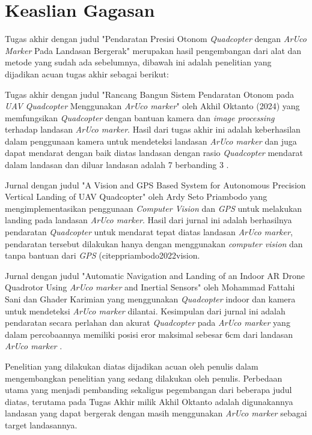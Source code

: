 \section{Keaslian Gagasan}
Tugas akhir dengan judul "Pendaratan Presisi Otonom \textit{Quadcopter} dengan \textit{ArUco Marker} Pada Landasan Bergerak" merupakan hasil pengembangan dari alat dan metode yang sudah ada sebelumnya, dibawah ini adalah penelitian yang dijadikan acuan tugas akhir sebagai berikut:

\begin{packed_enum}
	\item Tugas akhir dengan judul "Rancang Bangun Sistem Pendaratan Otonom pada \textit{UAV} \textit{Quadcopter} Menggunakan \textit{ArUco marker}" oleh Akhil Oktanto (2024) yang memfungsikan \textit{Quadcopter} dengan bantuan kamera dan \textit{image processing} terhadap landasan \textit{ArUco marker}. Hasil dari tugas akhir ini adalah keberhasilan dalam penggunaan kamera untuk mendeteksi landasan \textit{ArUco marker} dan juga dapat mendarat dengan baik diatas landasan dengan rasio \textit{Quadcopter} mendarat dalam landasan dan diluar landasan adalah 7 berbanding 3 \citep{akhiloktantoqc}.
	\item Jurnal dengan judul "A Vision and GPS Based System for Autonomous Precision Vertical Landing of UAV Quadcopter" oleh Ardy Seto Priambodo yang mengimplementasikan penggunaan \textit{Computer Vision} dan \textit{GPS} untuk melakukan landing pada landasan \textit{ArUco marker}. Hasil dari jurnal ini adalah berhasilnya pendaratan \textit{Quadcopter} untuk mendarat tepat diatas landasan \textit{ArUco marker}, pendaratan tersebut dilakukan hanya dengan menggunakan \textit{computer vision} dan tanpa bantuan dari \textit{GPS} (citep{priambodo2022vision}.
	\item Jurnal dengan judul "Automatic Navigation and Landing of an Indoor AR Drone Quadrotor Using \textit{ArUco marker} and Inertial Sensors" oleh Mohammad Fattahi Sani dan Ghader Karimian yang menggunakan \textit{Quadcopter} indoor dan kamera untuk mendeteksi \textit{ArUco marker} dilantai. Kesimpulan dari jurnal ini adalah pendaratan secara perlahan dan akurat \textit{Quadcopter} pada \textit{ArUco marker} yang dalam percobaannya memiliki posisi eror maksimal sebesar 6cm dari landasan \textit{ArUco marker} \citep{sani2017automatic}.
	
	Penelitian yang dilakukan diatas dijadikan acuan oleh penulis dalam mengembangkan penelitian  yang sedang dilakukan oleh penulis. Perbedaan utama yang menjadi pembanding sekaligus pegembangan dari beberapa judul diatas, terutama pada Tugas Akhir milik Akhil Oktanto adalah digunakannya landasan yang dapat bergerak dengan masih menggunakan \textit{ArUco marker} sebagai target landasannya.
\end{packed_enum}
